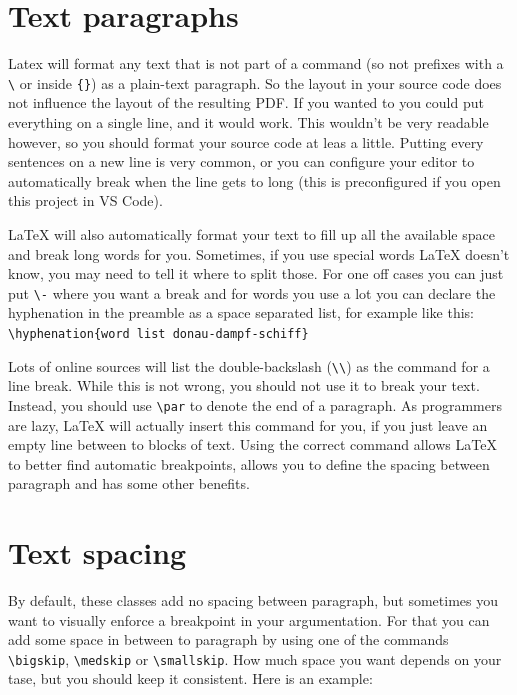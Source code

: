 \documentclass[	%
		fontsize=11pt,  %
		a4paper,	    %
		english,		%
		sans,			%
		f1,				%
	]{HsH-report}		%
\begin{document}
	\section{Text paragraphs} \label{sec: paragraphs}
		Latex will format any text that is not part of a command (so not prefixes with a \lstinline|\| or inside \lstinline|{}|) as a plain-text
		paragraph. So the layout in your source code does not influence the layout of the resulting PDF. If you wanted to you could put everything on
		a single line, and it would work. This wouldn't be very readable however, so you should format your source code at leas a little. Putting
		every sentences on a new line is very common, or you can configure your editor to automatically break when the line gets to long (this is
		preconfigured if you open this project in VS Code).

		LaTeX will also automatically format your text to fill up all the available space and break long words for you. Sometimes, if you use special
		words LaTeX doesn't know, you may need to tell it where to split those. For one off cases you can just put \lstinline|\-| where you want a
		break and for words you use a lot you can declare the hyphenation in the preamble as a space separated list, for example like this:
		\lstinline|\hyphenation{word list donau-dampf-schiff}|

		Lots of online sources will list the double-backslash (\lstinline|\\|) as the command for a line break. While this is not wrong, you should
		not use it to break your text. Instead, you should use \lstinline|\par| to denote the end of a paragraph. As programmers are lazy, LaTeX will
		actually insert this command for you, if you just leave an empty line between to blocks of text. Using the correct command allows LaTeX to
		better find automatic breakpoints, allows you to define the spacing between paragraph and has some other benefits.

	\section{Text spacing} \label{sec: spacing}
		By default, these classes add no spacing between paragraph, but sometimes you want to visually enforce a breakpoint in your argumentation. For
		that you can add some space in between to paragraph by using one of the commands \lstinline|\bigskip|, \lstinline|\medskip| or
		\lstinline|\smallskip|. How much space you want depends on your tase, but you should keep it consistent. Here is an example:
\end{document}
